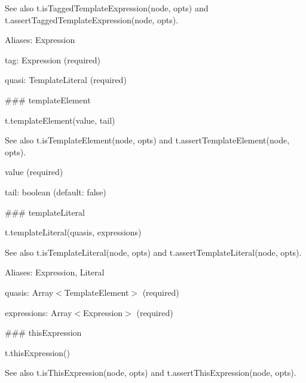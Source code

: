 See also {\ttfamily t.\+is\+Tagged\+Template\+Expression(node, opts)} and {\ttfamily t.\+assert\+Tagged\+Template\+Expression(node, opts)}.

Aliases\+: {\ttfamily Expression}


\begin{DoxyItemize}
\item {\ttfamily tag}\+: {\ttfamily Expression} (required)
\item {\ttfamily quasi}\+: {\ttfamily Template\+Literal} (required) 


\end{DoxyItemize}

\#\#\# template\+Element 
\begin{DoxyCode}
t.templateElement(value, tail)
\end{DoxyCode}


See also {\ttfamily t.\+is\+Template\+Element(node, opts)} and {\ttfamily t.\+assert\+Template\+Element(node, opts)}.


\begin{DoxyItemize}
\item {\ttfamily value} (required)
\item {\ttfamily tail}\+: {\ttfamily boolean} (default\+: {\ttfamily false}) 


\end{DoxyItemize}

\#\#\# template\+Literal 
\begin{DoxyCode}
t.templateLiteral(quasis, expressions)
\end{DoxyCode}


See also {\ttfamily t.\+is\+Template\+Literal(node, opts)} and {\ttfamily t.\+assert\+Template\+Literal(node, opts)}.

Aliases\+: {\ttfamily Expression}, {\ttfamily Literal}


\begin{DoxyItemize}
\item {\ttfamily quasis}\+: {\ttfamily Array$<$Template\+Element$>$} (required)
\item {\ttfamily expressions}\+: {\ttfamily Array$<$Expression$>$} (required) 


\end{DoxyItemize}

\#\#\# this\+Expression 
\begin{DoxyCode}
t.thisExpression()
\end{DoxyCode}


See also {\ttfamily t.\+is\+This\+Expression(node, opts)} and {\ttfamily t.\+assert\+This\+Expression(node, opts)}.

